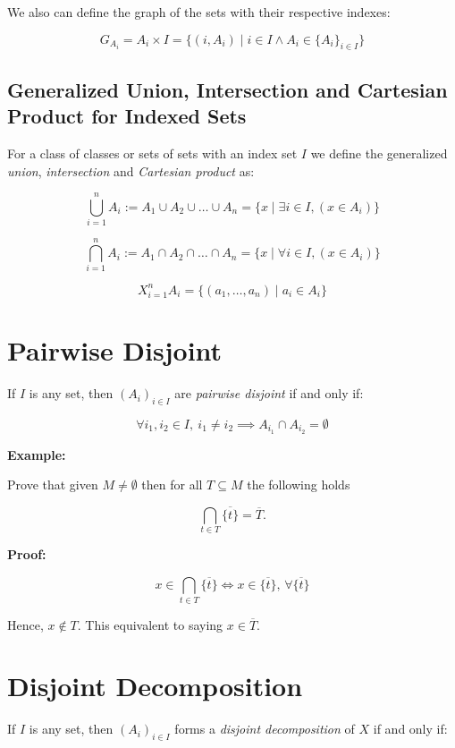 We also can define the graph of the sets with their respective indexes:

\[
	G_{A_i} = A_i \times I = \{(i, A_i) \mid i \in I \land  A_i \in \{A_i\}_{i \in I}\}
\]

\subsection{Generalized Union, Intersection and Cartesian Product for Indexed Sets}

For a class of classes or sets of sets with an index set \(I\) we define the generalized \emph{union}, \emph{intersection}
and \emph{Cartesian product} as:

\[
	\bigcup_{i=1}^{n} A_i := A_1 \cup A_2 \cup \dots \cup A_n = \{ x \mid \exists i \in I, (x \in A_i) \}
\]

\[
	\bigcap_{i=1}^{n} A_i := A_1 \cap A_2 \cap \dots \cap A_n = \{ x \mid \forall i \in I, (x \in A_i) \}
\]

\[
	X_{i=1}^{n} A_i = \{(a_1, \dots, a_n) \mid a_i \in A_i \}
\]

\section{Pairwise Disjoint}

If \(I\) is any set, then \( {(A_i)}_{i \in I} \) are \emph{pairwise disjoint} if and only if:

\[
	\forall i_1, i_2 \in I, \ i_1 \neq i_2 \implies A_{i_1} \cap A_{i_2} = \emptyset
\]

\textbf{Example:}

Prove that given \(M \neq \emptyset\) then for all \(T \subseteq M\) the following holds

\[
	\bigcap_{t \in T} \overline{\{t\}} = \overline{T}.
\]

\textbf{Proof:}

\[
	x \in \bigcap_{t \in T} \overline{\{t\}} \iff x \in \overline{\{t\}}, \, \forall \overline{\{t\}}
\]

Hence, \(x \notin T\). This equivalent to saying \(x \in \overline{T}\).

\QED

\section{Disjoint Decomposition}

If \(I\) is any set, then \( {(A_i)}_{i \in I} \) forms a \emph{disjoint decomposition} of \(X\) if
and only if:

